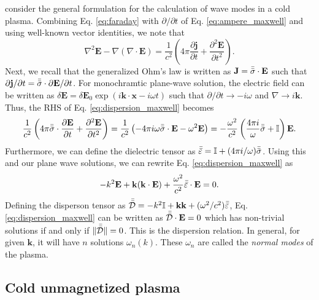  consider the general formulation for the calculation of wave modes in a cold plasma. Combining Eq. \ref{eq:faraday} with $\partial/\partial t$ of Eq. \ref{eq:ampere_maxwell} and using well-known vector identities, we note that 
\begin{equation}
	\label{eq:dispersion_maxwell}
	\nabla^2\mathbf{E} - \nabla(\nabla\cdot\mathbf{E}) = \frac{1}{c^2}\left(4\pi\frac{\partial\mathbf{j}}{\partial t} + \frac{\partial^2\mathbf{E}}{\partial t^2}\right).
\end{equation}
Next, we recall that the generalized Ohm's law is written as $\mathbf{J}=\bar{\bar{\sigma}}\cdot\mathbf{E}$ such that $\partial\mathbf{j}/\partial t=\bar{\bar{\sigma}}\cdot\partial\mathbf{E}/\partial t$. For monochramtic plane-wave solution, the electric field can be written as $\delta\mathbf{E}=\delta\mathbf{E}_0\exp{(i\mathbf{k}\cdot\mathbf{x}-i\omega t)}$ such that $\partial/\partial t\to-i\omega$ and $\nabla\to i\mathbf{k}$. Thus, the RHS of Eq. \ref{eq:dispersion_maxwell} becomes
\begin{equation}
\frac{1}{c^2}\left(4\pi\bar{\bar{\sigma}}\cdot\frac{\partial\mathbf{E}}{\partial t} + \frac{\partial^2\mathbf{E}}{\partial t^2}\right) = \frac{1}{c^2}\left(-4\pi i\omega\bar{\bar{\sigma}}\cdot\mathbf{E} - \omega^2\mathbf{E}\right) = -\frac{\omega^2}{c^2}\left(\frac{4\pi i}{\omega}\bar{\bar{\sigma}} + \mathbb{I}\right)\mathbf{E}.
\end{equation}
Furthermore, we can define the dielectric tensor as $\bar{\bar{\varepsilon}}=\mathbb{I} + (4\pi i/\omega)\bar{\bar{\sigma}}$. Using this and our plane wave solutions, we can rewrite Eq. \ref{eq:dispersion_maxwell} as
\begin{equation}
-k^2\mathbf{E} + \mathbf{k}(\mathbf{k}\cdot\mathbf{E}) + \frac{\omega^2}{c^2}\bar{\bar{\varepsilon}}\cdot\mathbf{E} = 0.
\end{equation}
Defining the disperson tensor as $\bar{\bar{\mathcal{D}}}=-k^2\mathbb{I} + \mathbf{kk} + (\omega^2/c^2)\bar{\bar{\varepsilon}}$,  Eq. \ref{eq:dispersion_maxwell} can be written as $\bar{\bar{\mathcal{D}}}\cdot\mathbf{E}=0$ which has non-trivial solutions if and only if $\|\bar{\bar{\mathcal{D}}}\|=0$. This is the dispersion relation. In general, for given $\mathbf{k}$, it will have $n$ solutions $\omega_n(k)$. These $\omega_n$ are called the \textit{normal modes} of the plasma.

	\subsection{Cold unmagnetized plasma}


